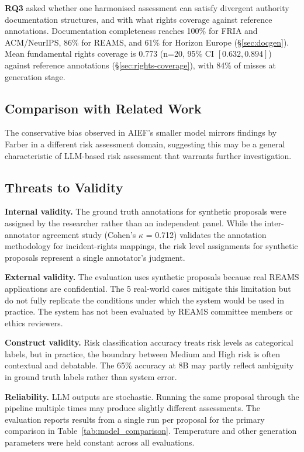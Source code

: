\textbf{RQ3} asked whether one harmonised assessment can satisfy divergent authority documentation structures, and with what rights coverage against reference annotations. Documentation completeness reaches 100\% for FRIA and ACM/NeurIPS, 86\% for REAMS, and 61\% for Horizon Europe (\S\ref{sec:docgen}). Mean fundamental rights coverage is 0.773 (n=20, 95\% CI $[0.632, 0.894]$) against reference annotations (\S\ref{sec:rights-coverage}), with 84\% of misses at generation stage.


\subsection{Comparison with Related Work}

The conservative bias observed in AIEF's smaller model mirrors findings by Farber \cite{farber2025} in a different risk assessment domain, suggesting this may be a general characteristic of LLM-based risk assessment that warrants further investigation.


\subsection{Threats to Validity}

\textbf{Internal validity.} The ground truth annotations for synthetic proposals were assigned by the researcher rather than an independent panel. While the inter-annotator agreement study (Cohen's $\kappa$ = 0.712) validates the annotation methodology for incident-rights mappings, the risk level assignments for synthetic proposals represent a single annotator's judgment.

\textbf{External validity.} The evaluation uses synthetic proposals because real REAMS applications are confidential. The 5 real-world cases mitigate this limitation but do not fully replicate the conditions under which the system would be used in practice. The system has not been evaluated by REAMS committee members or ethics reviewers.

\textbf{Construct validity.} Risk classification accuracy treats risk levels as categorical labels, but in practice, the boundary between Medium and High risk is often contextual and debatable. The 65\% accuracy at 8B may partly reflect ambiguity in ground truth labels rather than system error.

\textbf{Reliability.} LLM outputs are stochastic. Running the same proposal through the pipeline multiple times may produce slightly different assessments. The evaluation reports results from a single run per proposal for the primary comparison in Table~\ref{tab:model_comparison}. Temperature and other generation parameters were held constant across all evaluations.

